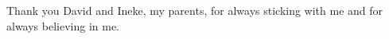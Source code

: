 Thank you David and Ineke, my parents, for always sticking with me and for always believing in me. 

